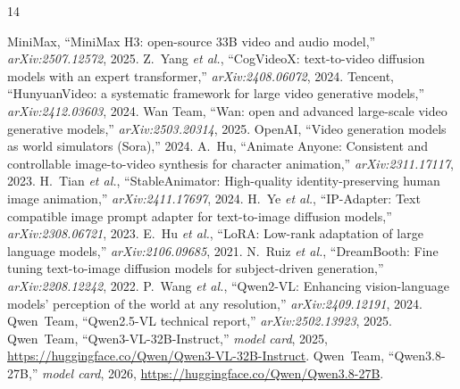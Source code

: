 \documentclass[conference]{IEEEtran}
\begin{document}

\begin{thebibliography}{14}

 MiniMax, ``MiniMax H3: open-source 33B video and audio model,'' \emph{arXiv:2507.12572}, 2025.
 Z.~Yang \emph{et al.}, ``CogVideoX: text-to-video diffusion models with an expert transformer,'' \emph{arXiv:2408.06072}, 2024.
 Tencent, ``HunyuanVideo: a systematic framework for large video generative models,'' \emph{arXiv:2412.03603}, 2024.
 Wan Team, ``Wan: open and advanced large-scale video generative models,'' \emph{arXiv:2503.20314}, 2025.
 OpenAI, ``Video generation models as world simulators (Sora),'' 2024.
 A.~Hu, ``Animate Anyone: Consistent and controllable image-to-video synthesis for character animation,'' \emph{arXiv:2311.17117}, 2023.
 H.~Tian \emph{et al.}, ``StableAnimator: High-quality identity-preserving human image animation,'' \emph{arXiv:2411.17697}, 2024.
 H.~Ye \emph{et al.}, ``IP-Adapter: Text compatible image prompt adapter for text-to-image diffusion models,'' \emph{arXiv:2308.06721}, 2023.
 E.~Hu \emph{et al.}, ``LoRA: Low-rank adaptation of large language models,'' \emph{arXiv:2106.09685}, 2021.
 N.~Ruiz \emph{et al.}, ``DreamBooth: Fine tuning text-to-image diffusion models for subject-driven generation,'' \emph{arXiv:2208.12242}, 2022.
 P.~Wang \emph{et al.}, ``Qwen2-VL: Enhancing vision-language models' perception of the world at any resolution,'' \emph{arXiv:2409.12191}, 2024.
 Qwen~Team, ``Qwen2.5-VL technical report,'' \emph{arXiv:2502.13923}, 2025.
 Qwen~Team, ``Qwen3-VL-32B-Instruct,'' \emph{model card}, 2025, \url{https://huggingface.co/Qwen/Qwen3-VL-32B-Instruct}.
 Qwen~Team, ``Qwen3.8-27B,'' \emph{model card}, 2026, \url{https://huggingface.co/Qwen/Qwen3.8-27B}.
\end{thebibliography}
\end{document}
